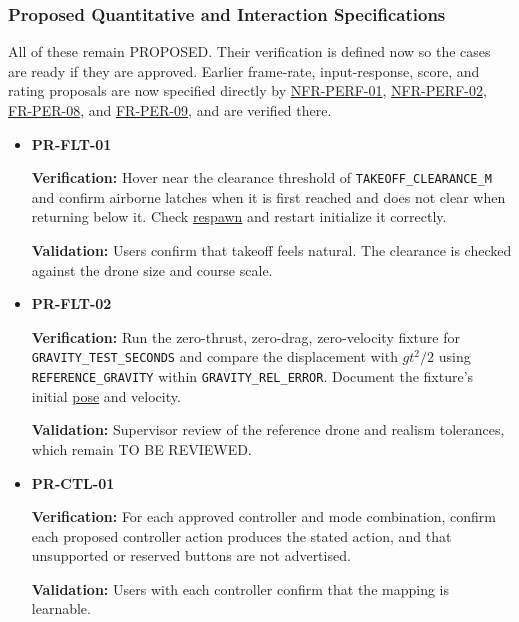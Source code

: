 \documentclass[12pt]{article}
\begin{document}
\subsubsection{Proposed Quantitative and Interaction Specifications}
\label{sec:proposed-performance}
All of these remain PROPOSED. Their verification is defined now so the cases
are ready if they are approved. Earlier frame-rate, input-response, score,
and rating proposals are now specified directly by
\hyperlink{req:NFR-PERF-01}{NFR-PERF-01},
\hyperlink{req:NFR-PERF-02}{NFR-PERF-02},
\hyperlink{req:FR-PER-08}{FR-PER-08}, and
\hyperlink{req:FR-PER-09}{FR-PER-09}, and are verified there.
\begin{itemize}
\item \hypertarget{req:PR-FLT-01}{}\textbf{PR-FLT-01}\par
 \textbf{Verification:} Hover near the clearance threshold of
 \texttt{TAKEOFF\_CLEARANCE\_M} and confirm airborne latches when it is first
 reached and does not clear when returning below it. Check \hyperlink{glos:Respawn}{respawn} and restart
 initialize it correctly.\par
 \textbf{Validation:} Users confirm that takeoff feels natural. The clearance is
 checked against the drone size and course scale.
\item \hypertarget{req:PR-FLT-02}{}\textbf{PR-FLT-02}\par
 \textbf{Verification:} Run the zero-thrust, zero-drag, zero-velocity
 fixture for \texttt{GRAVITY\_TEST\_SECONDS} and compare the displacement with
 $gt^2/2$ using \texttt{REFERENCE\_GRAVITY} within
 \texttt{GRAVITY\_REL\_ERROR}. Document the fixture's initial \hyperlink{glos:Tracking}{pose} and
 velocity.\par
 \textbf{Validation:} Supervisor review of the reference drone and realism
 tolerances, which remain TO BE REVIEWED.
\item \hypertarget{req:PR-CTL-01}{}\textbf{PR-CTL-01}\par
 \textbf{Verification:} For each approved controller and mode
 combination, confirm each proposed controller action produces the stated
 action, and that unsupported or reserved buttons are not advertised.\par
 \textbf{Validation:} Users with each controller confirm that the mapping is learnable.
\end{itemize}
\end{document}
